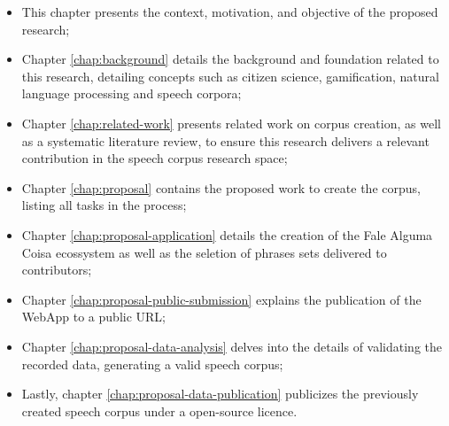 \begin{itemize}
    \item This chapter presents the context, motivation, and objective of the proposed research;
    \item Chapter \ref{chap:background} details the background and foundation related to this research, detailing concepts such as citizen science, gamification, natural language processing and speech corpora;
    \item Chapter \ref{chap:related-work} presents related work on corpus creation, as well as a systematic literature review, to ensure this research delivers a relevant contribution in the speech corpus research space;
    \item Chapter \ref{chap:proposal} contains the proposed work to create the corpus, listing all tasks in the process;
    \item Chapter \ref{chap:proposal-application} details the creation of the Fale Alguma Coisa ecossystem as well as the seletion of phrases sets delivered to contributors;
    \item Chapter \ref{chap:proposal-public-submission} explains the publication of the WebApp to a public URL;
    \item Chapter \ref{chap:proposal-data-analysis} delves into the details of validating the recorded data, generating a valid speech corpus;
    \item Lastly, chapter \ref{chap:proposal-data-publication} publicizes the previously created speech corpus under a open-source licence.
\end{itemize}
